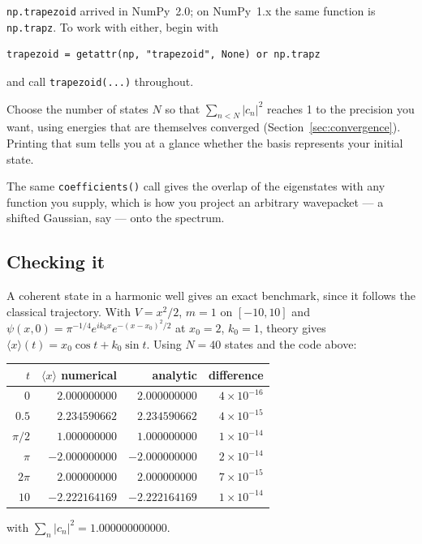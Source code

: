 \documentclass[11pt]{article}
\begin{document}
\texttt{np.trapezoid} arrived in NumPy~2.0; on NumPy~1.x the same function is
\texttt{np.trapz}. To work with either, begin with
\begin{lstlisting}[style=py]
trapezoid = getattr(np, "trapezoid", None) or np.trapz
\end{lstlisting}
and call \texttt{trapezoid(...)} throughout.

Choose the number of states $N$ so that $\sum_{n<N} |c_n|^{2}$ reaches 1 to the
precision you want, using energies that are themselves converged
(Section~\ref{sec:convergence}). Printing that sum tells you at a glance
whether the basis represents your initial state.

The same \texttt{coefficients()} call gives the overlap of the eigenstates with
any function you supply, which is how you project an arbitrary wavepacket ---
a shifted Gaussian, say --- onto the spectrum.

\subsection{Checking it}

A coherent state in a harmonic well gives an exact benchmark, since it follows
the classical trajectory. With $V = x^{2}/2$, $m=1$ on $[-10,10]$ and
$\psi(x,0) = \pi^{-1/4} e^{ik_0 x} e^{-(x-x_0)^{2}/2}$ at $x_0=2$, $k_0=1$,
theory gives $\langle x\rangle(t) = x_0\cos t + k_0 \sin t$. Using $N=40$
states and the code above:

\begin{center}
\begin{tabular}{@{}rrrr@{}}
\toprule
$t$ & $\langle x\rangle$ numerical & analytic & difference \\
\midrule
$0$       & $2.000000000$  & $2.000000000$  & $4\times10^{-16}$ \\
$0.5$     & $2.234590662$  & $2.234590662$  & $4\times10^{-15}$ \\
$\pi/2$   & $1.000000000$  & $1.000000000$  & $1\times10^{-14}$ \\
$\pi$     & $-2.000000000$ & $-2.000000000$ & $2\times10^{-14}$ \\
$2\pi$    & $2.000000000$  & $2.000000000$  & $7\times10^{-15}$ \\
$10$      & $-2.222164169$ & $-2.222164169$ & $1\times10^{-14}$ \\
\bottomrule
\end{tabular}
\end{center}

with $\sum_n |c_n|^{2} = 1.000000000000$.
\end{document}
